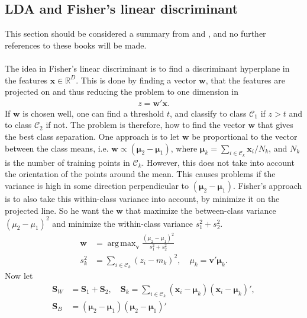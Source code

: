 \documentclass[10pt,a4paper]{article}
\DeclareMathOperator*{\argmax}{arg\,max}
\begin{document}
\subsection{LDA and Fisher's linear discriminant}
\label{sub:LDA and Fisher's linear discriminant}
This section should be considered a summary from \cite[ch.~4.1.4]{bishop} and \cite[ch.~4.3]{modstat}, and no further references to these books will be made. \\
\\
The idea in Fisher's linear discriminant is to find a discriminant hyperplane in the features $\mathbf{x}\in \mathbb{R}^D$. This is done by finding a vector $\mathbf{w}$, that the features are projected on and thus reducing the problem to one dimension in 
\begin{align}
  z = \mathbf{w}'\mathbf{x}.
\end{align}
If $\mathbf{w}$ is chosen well, one can find a threshold $t$, and classify to class $\mathcal{C}_1$ if $z > t$ and to class $\mathcal{C}_2$ if not. The problem is therefore, how to find the vector $\mathbf{w}$ that gives the best class separation. One approach is to let $\mathbf{w}$ be proportional to the vector between the class means, i.e. $\mathbf{w} \propto (\bm{\mu}_2 - \bm{\mu}_1)$, where $\bm{\mu}_k = \sum_{i \in \mathcal{C}_k} \mathbf{x}_i/N_k$, and $N_k$ is the number of training points in $\mathcal{C}_k$. However, this does not take into account the orientation of the points around the mean. This causes problems if the variance is high in some direction perpendicular to $(\bm{\mu}_2 - \bm{\mu}_1)$. Fisher's approach is to also take this within-class variance into account, by minimize it on the projected line. So he want the $\mathbf{w}$ that maximize the between-class variance $(\mu_2 - \mu_1)^2$ and minimize the within-class variance $s_1^2 + s_2^2$. 
\begin{align}
  \label{eq:fisherMax} 
  \mathbf{w} &= \argmax_{\mathbf{v}} \frac{(\mu_2 - \mu_1)^2}{s_1^2 + s_2^2} \\
  s_k^2 &= \sum_{i \in \mathcal{C}_k} (z_i - m_k)^2, \quad \mu_k = \mathbf{v}'\bm{\mu}_k.
\end{align}
Now let 
\begin{align}
  \mathbf{S}_W &= \mathbf{S}_1 + \mathbf{S}_2, \quad  \mathbf{S}_k =  \sum_{i \in \mathcal{C}_k} (\mathbf{x}_i - \bm{\mu}_k)(\mathbf{x}_i - \bm{\mu}_k)', \\
  \label{eq:SB} 
  \mathbf{S}_B &= (\bm{\mu}_2 - \bm{\mu}_1)(\bm{\mu}_2 - \bm{\mu}_1)'
\end{align}
\end{document}
